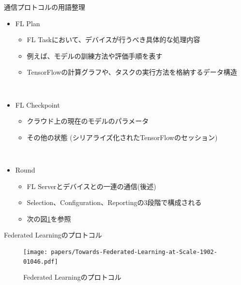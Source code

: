 \documentclass[dvipdfmx,notheorems,t]{beamer}
\begin{document}
\begin{frame}{通信プロトコルの用語整理}

\begin{itemize}
	\item \alert{FL Plan}
	\begin{itemize}
		\item FL Taskにおいて、デバイスが行うべき具体的な処理内容
		\item 例えば、モデルの訓練方法や評価手順を表す
		\newline
		
		\item TensorFlowの計算グラフや、タスクの実行方法を格納するデータ構造
	\end{itemize} \
	
	\item \alert{FL Checkpoint}
	\begin{itemize}
		\item クラウド上の現在のモデルのパラメータ
		\item その他の状態 (シリアライズ化されたTensorFlowのセッション)
	\end{itemize} \
	
	\item \alert{Round}
	\begin{itemize}
		\item FL Serverとデバイスとの一連の通信(後述)
		\item \alert{Selection}、\alert{Configuration}、\alert{Reporting}の3段階で構成される
		\item 次の図\ref{fig:fl-protocol}を参照
	\end{itemize}
\end{itemize}

\end{frame}

\begin{frame}{Federated Learningのプロトコル}

\begin{figure}
	\centering
	\texttt{[image: papers/Towards-Federated-Learning-at-Scale-1902-01046.pdf]}
	\caption{Federated Learningのプロトコル~\cite{DBLP:journals/corr/abs-1902-01046}}
	\label{fig:fl-protocol}
\end{figure}

\end{frame}
\end{document}
